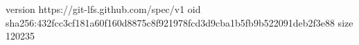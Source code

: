 version https://git-lfs.github.com/spec/v1
oid sha256:432fcc3cf181a60f160d8875c8f921978fcd3d9cba1b5fb9b522091deb2f3e88
size 120235
